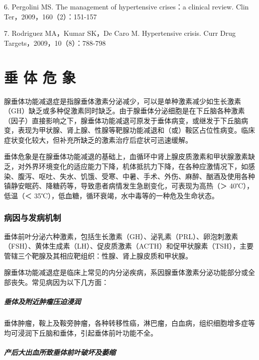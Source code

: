6. Pergolini MS. The management of hypertensive crises：a clinical
review. Clin Ter，2009，160（2）：151-157

7. Rodriguez MA，Kumar SK，De Caro M. Hypertensive crisis. Curr Drug
Targets，2009，10（8）：788-798

\protect\hypertarget{text00110.html}{}{}

\chapter{垂 体 危 象}

腺垂体功能减退症是指腺垂体激素分泌减少，可以是单种激素减少如生长激素（GH）缺乏或多种促激素同时缺乏。由于腺垂体分泌细胞是在下丘脑各种激素（因子）直接影响之下，腺垂体功能减退可原发于垂体病变，或继发于下丘脑病变，表现为甲状腺、肾上腺、性腺等靶腺功能减退和（或）鞍区占位性病变。临床症状变化较大，但补充所缺乏的激素治疗后症状可迅速缓解。

垂体危象是在腺垂体功能减退的基础上，血循环中肾上腺皮质激素和甲状腺激素缺乏，对外界环境变化的适应能力下降，机体抵抗力下降，在各种应激情况下，如感染、腹泻、呕吐、失水、饥饿、受寒、中暑、手术、外伤、麻醉、酗酒及使用各种镇静安眠药、降糖药等，导致患者病情发生急剧变化，可表现为高热（＞
40℃），低温（＜ 35℃），低血糖，循环衰竭，水中毒等的一种危及生命状态。

\subsection{病因与发病机制}

垂体前叶分泌六种激素，包括生长激素（GH）、泌乳素（PRL）、卵泡刺激素（FSH）、黄体生成素（LH）、促皮质激素（ACTH）和促甲状腺素（TSH），主要管辖三个靶腺及其相应靶组织：性腺、肾上腺皮质和甲状腺。

腺垂体功能减退症是临床上常见的内分泌疾病，系因腺垂体激素分泌功能部分或全部丧失。常见病因为以下几方面：

\paragraph{垂体及附近肿瘤压迫浸润}

垂体肿瘤，鞍上及鞍旁肿瘤，各种转移性癌，淋巴瘤，白血病，组织细胞增多症等均可浸润下丘脑和垂体，引起垂体前叶功能不全。

\paragraph{产后大出血所致垂体前叶破坏及萎缩}

